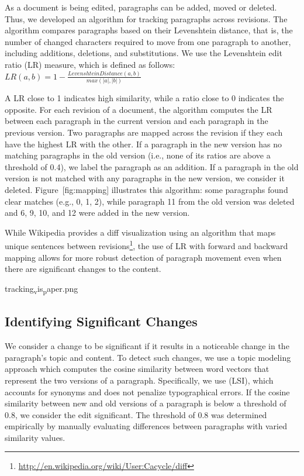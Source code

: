 As a document is being edited, paragraphs can be added, moved or
deleted. Thus, we developed an algorithm for tracking paragraphs across
revisions. The algorithm compares paragraphs based on their Levenshtein
distance, that is, the number of changed characters required to move
from one paragraph to another, including additions, deletions, and
substitutions. We use the Levenshtein edit ratio (LR) measure, which is
defined as follows:
\(LR(a,b) = 1-\frac{Levenshtein Distance(a,b)}{max(|a|,|b|)} \)

A LR close to 1 indicates high similarity, while a ratio close to 0
indicates the opposite. For each revision of a document, the algorithm
computes the LR between each paragraph in the current version and each
paragraph in the previous version. Two paragraphs are mapped across the
revision if they each have the highest LR with the other. If a paragraph
in the new version has no matching paragraphs in the old version (i.e.,
none of its ratios are above a threshold of 0.4), we label the paragraph
as an addition. If a paragraph in the old version is not matched with
any paragraphs in the new version, we consider it deleted.
Figure~{[}fig:mapping{]} illustrates this algorithm: some paragraphs
found clear matches (e.g., 0, 1, 2), while paragraph 11 from the old
version was deleted and 6, 9, 10, and 12 were added in the new version.

While Wikipedia provides a diff visualization using an algorithm that
maps unique sentences between revisions\footnote{\url{http://en.wikipedia.org/wiki/User:Cacycle/diff}},
the use of LR with forward and backward mapping allows for more robust
detection of paragraph movement even when there are significant changes
to the content.

tracking\textsubscript{v}is\textsubscript{p}aper.png

\subsection{Identifying Significant
Changes}\label{identifying-significant-changes}

We consider a change to be significant if it results in a noticeable
change in the paragraph's topic and content. To detect such changes, we
use a topic modeling approach which computes the cosine similarity
between word vectors that represent the two versions of a paragraph.
Specifically, we use (LSI), which accounts for synonyms and does not
penalize typographical errors. If the cosine similarity between new and
old versions of a paragraph is below a threshold of 0.8, we consider the
edit significant. The threshold of 0.8 was determined empirically by
manually evaluating differences between paragraphs with varied
similarity values.


